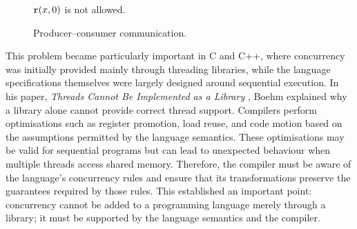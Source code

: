 \begin{figure}[ht]
\begin{minipage}[t]{0.48\textwidth}

$\mathtt{r}(x,0)$ is not allowed.
\end{minipage}

\caption{Producer--consumer communication.}
\label{fig:producer-consumer-ra}
\end{figure}

This problem became particularly important in C and C++, where concurrency was initially provided mainly through threading libraries, while the language specifications themselves were largely designed around sequential execution. In his paper, \emph{Threads Cannot Be Implemented as a Library} \cite{boehm2005threads}, Boehm explained why a library alone cannot provide correct thread support. Compilers perform optimisations such as register promotion, load reuse, and code motion based on the assumptions permitted by the language semantics. These optimisations may be valid for sequential programs but can lead to unexpected behaviour when multiple threads access shared memory. Therefore, the compiler must be aware of the language's concurrency rules and ensure that its transformations preserve the guarantees required by those rules. This established an important point: concurrency cannot be added to a programming language merely through a library; it must be supported by the language semantics and the compiler.

